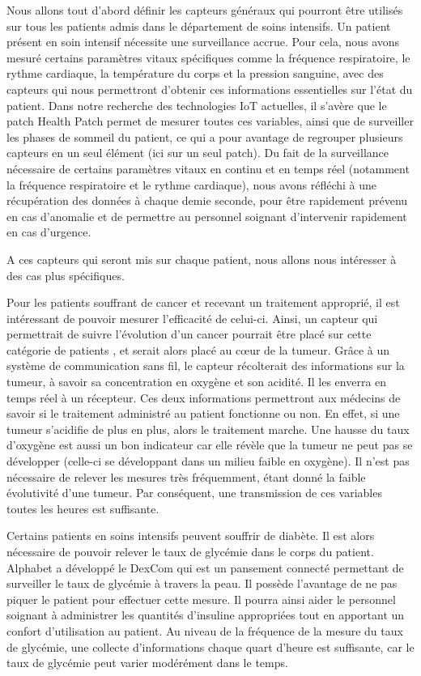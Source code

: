 \documentclass{article}
\begin{document}
Nous allons tout d’abord définir les capteurs généraux qui pourront être utilisés sur tous les patients admis dans le département de soins intensifs. Un patient présent en soin intensif nécessite une surveillance accrue. Pour cela, nous avons mesuré certains paramètres vitaux spécifiques comme la fréquence respiratoire, le rythme cardiaque, la température du corps et la pression sanguine, avec des capteurs qui nous permettront d’obtenir ces informations essentielles sur l’état du patient.  Dans notre recherche des technologies IoT actuelles, il s’avère que le patch Health Patch \cite{HealthPatch} permet de mesurer toutes ces variables, ainsi que de surveiller les phases de sommeil du patient, ce qui a pour avantage de regrouper plusieurs capteurs en un seul élément (ici sur un seul patch). Du fait de la surveillance nécessaire de certains paramètres vitaux en continu et en temps réel (notamment la fréquence respiratoire et le rythme cardiaque), nous avons réfléchi à une récupération des données à chaque demie seconde, pour être rapidement prévenu en cas d’anomalie et de permettre au personnel soignant d’intervenir rapidement en cas d’urgence.

A ces capteurs qui seront mis sur chaque patient, nous allons nous intéresser à des cas plus spécifiques.

Pour les patients souffrant de cancer et recevant un traitement approprié, il est intéressant de pouvoir mesurer l’efficacité de celui-ci. Ainsi, un capteur qui permettrait de suivre l’évolution d’un cancer \cite{Cancer} pourrait être placé sur cette catégorie de patients , et serait alors placé au cœur de la tumeur. Grâce à un système de communication sans fil, le capteur récolterait des informations sur la tumeur, à savoir sa concentration en oxygène et son acidité. Il les enverra en temps réel à un récepteur. Ces deux informations permettront aux médecins de savoir si le traitement administré au patient fonctionne ou non. En effet, si une tumeur s’acidifie de plus en plus, alors le traitement marche. Une hausse du taux d’oxygène est aussi un bon indicateur car elle révèle que la tumeur ne peut pas se développer (celle-ci se développant dans un milieu faible en oxygène). Il n’est pas nécessaire de relever les mesures très fréquemment, étant donné la faible évolutivité d’une tumeur. Par conséquent, une transmission de ces variables toutes les heures est suffisante.

Certains patients en soins intensifs peuvent souffrir de diabète. Il est alors nécessaire de pouvoir relever le taux de glycémie dans le corps du patient. Alphabet a développé le DexCom \cite{Diabete} qui  est un pansement connecté permettant de surveiller le taux de glycémie à travers la peau. Il possède l’avantage de ne pas piquer le patient pour effectuer cette mesure. Il pourra ainsi aider le personnel soignant à administrer les quantités d’insuline appropriées tout en apportant un confort d’utilisation au patient.  Au niveau de la fréquence de la mesure du taux de glycémie, une collecte d’informations chaque quart d'heure est suffisante, car le taux de glycémie peut varier modérément dans le temps.
\end{document}
